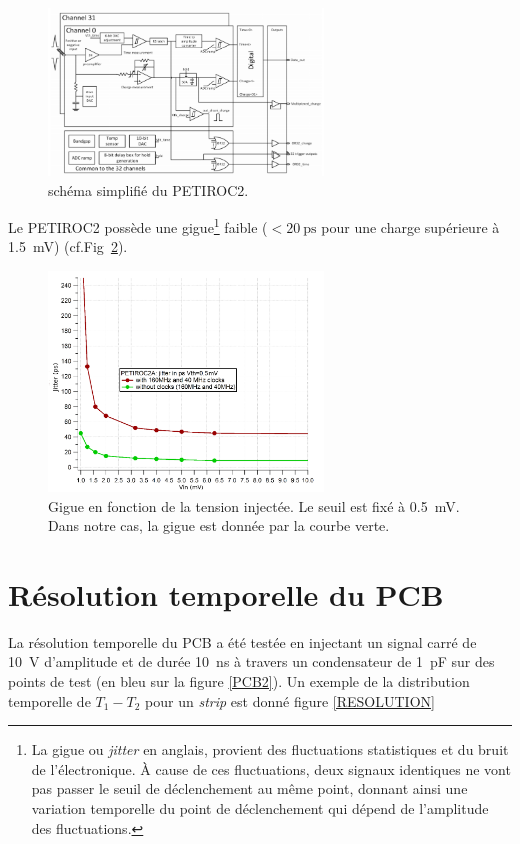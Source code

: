 \begin{figure}[ht!]
	\centering
	\includegraphics[width=0.65\textwidth]{ELE/Scheme.png}
	\captionsetup{type=figure}\caption{schéma simplifié du PETIROC2.}
	\label{SchemePETIROC}
\end{figure}

Le PETIROC2 possède une gigue\footnote{La gigue ou \textit{jitter} en anglais, provient des fluctuations statistiques et du bruit de l'électronique. À cause de ces fluctuations, deux signaux identiques ne vont pas passer le seuil de déclenchement au même point, donnant ainsi une variation temporelle du point de déclenchement qui dépend de l'amplitude des fluctuations.} faible ($<\SI{20}{\pico\second}$ pour une charge supérieure à \SI{1.5}{\milli\volt}) (cf.Fig~\ref{jitter}).

\begin{figure}[ht!]
	\centering
	\includegraphics[width=0.65\textwidth]{ELE/Jitter.png}
	\captionsetup{type=figure}\caption{Gigue en fonction de la tension injectée. Le seuil est fixé à \SI{0.5}{\milli\volt}. Dans notre cas, la gigue est donnée par la courbe verte.}
	\label{jitter}
\end{figure}

\vspace{0.4cm}
\section{Résolution temporelle du PCB}
La résolution temporelle du PCB a été testée en injectant un signal carré de \SI{10}{\volt} d'amplitude et de durée \SI{10}{\nano\second} à travers un condensateur de \SI{1}{\pico\farad} sur des points de test (en bleu sur la figure \ref{PCB2}). Un exemple de la distribution temporelle de $T_{1}-T_{2}$ pour un \textit{strip} est donné figure \ref{RESOLUTION}

